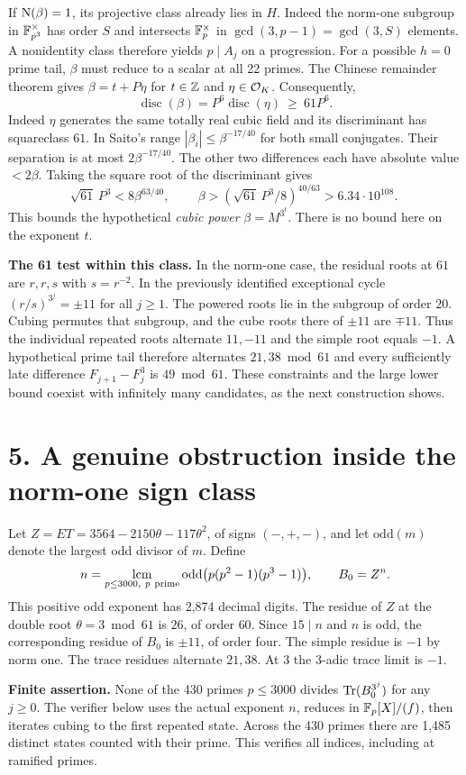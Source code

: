 \documentclass[11pt,a4paper,oneside,openany]{book}
\newcommand{\lead}[1]{\textbf{#1}\enspace}\let\para\lead
\newcommand{\localhead}[1]{\needspace{5\baselineskip}\section*{\color{ink}#1}}
\let\sect\localhead\let\secx\localhead\let\head\localhead
\begin{document}
If $\operatorname{N}(\beta)=1$, its projective class already lies in $H$. Indeed the norm-one subgroup in $\mathbb F_{p^3}^\times$ has order $S$ and intersects $\mathbb F_p^\times$ in $\gcd(3,p-1)=\gcd(3,S)$ elements. A nonidentity class therefore yields $p\mid A_j$ on a progression. For a possible $h=0$ prime tail, $\beta$ must reduce to a scalar at all 22 primes. The Chinese remainder theorem gives $\beta=t+P\eta$ for $t\in\mathbb Z$ and $\eta\in\mathcal O_K$. Consequently,
\[
 \operatorname{disc}(\beta)=P^6\operatorname{disc}(\eta)\ \ge\ 61P^6.
\]
Indeed $\eta$ generates the same totally real cubic field and its discriminant has squareclass $61$. In Saito's range $|\beta_i|\le\beta^{-17/40}$ for both small conjugates. Their separation is at most $2\beta^{-17/40}$. The other two differences each have absolute value $<2\beta$. Taking the square root of the discriminant gives
\[
 \sqrt{61}\,P^3<8\beta^{63/40},\qquad
 \boxed{\ \beta>(\sqrt{61}\,P^3/8)^{40/63}>6.34\cdot10^{108}.\ }
\]
This bounds the hypothetical \emph{cubic power} $\beta=M^{3^t}$. There is no bound here on the exponent $t$.

\lead{The 61 test within this class.} In the norm-one case, the residual roots at $61$ are $r,r,s$ with $s=r^{-2}$. In the previously identified exceptional cycle $(r/s)^{3^j}=\pm11$ for all $j\ge1$. The powered roots lie in the subgroup of order $20$. Cubing permutes that subgroup, and the cube roots there of $\pm11$ are $\mp11$. Thus the individual repeated roots alternate $11,-11$ and the simple root equals $-1$. A hypothetical prime tail therefore alternates $21,38\bmod61$ and every sufficiently late difference $F_{j+1}-F_j^3$ is $49\bmod61$. These constraints and the large lower bound coexist with infinitely many candidates, as the next construction shows.



\sect{5. A genuine obstruction inside the norm-one sign class}
Let $Z=ET=3564-2150\theta-117\theta^2$, of signs $(-,+,-)$, and let $\mathrm{odd}(m)$ denote the largest odd divisor of $m$. Define
\[
 n=\mathop{\rm lcm}_{p\le3000,\ p\ {\rm prime}}\mathrm{odd}\bigl(p(p^2-1)(p^3-1)\bigr),
 \qquad B_0=Z^n .
\]
This positive odd exponent has 2,874 decimal digits. The residue of $Z$ at the double root $\theta=3\bmod61$ is $26$, of order $60$. Since $15\mid n$ and $n$ is odd, the corresponding residue of $B_0$ is $\pm11$, of order four. The simple residue is $-1$ by norm one. The trace residues alternate $21,38$. At $3$ the $3$-adic trace limit is $-1$.

\lead{Finite assertion.} None of the 430 primes $p\le3000$ divides $\operatorname{Tr}(B_0^{3^j})$ for any $j\ge0$. The verifier below uses the actual exponent $n$, reduces in $\mathbb F_p[X]/(f)$, then iterates cubing to the first repeated state. Across the 430 primes there are 1,485 distinct states counted with their prime. This verifies all indices, including at ramified primes.
\end{document}
